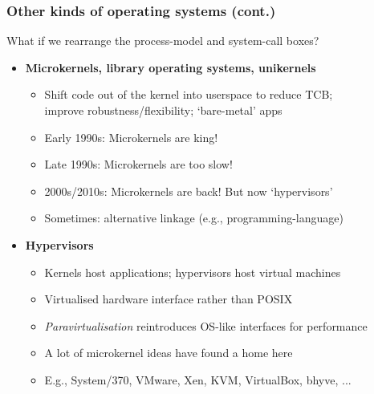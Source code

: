 \begin{frame}
  \frametitle{Other kinds of operating systems (cont.)}

  \bigskip
  What if we rearrange the process-model and system-call boxes?

  \pause
  \bigskip

  \begin{itemize}
    \item \textbf{Microkernels, library operating systems, unikernels}
    \begin{itemize}
      \item Shift code out of the kernel into userspace to reduce TCB; \\
	improve robustness/flexibility; `bare-metal' apps
      \item Early 1990s: Microkernels are king!
      \item Late 1990s: Microkernels are too slow!
      \item 2000s/2010s: Microkernels are back! But now `hypervisors'
      \item Sometimes: alternative linkage (e.g., programming-language)
    \end{itemize}

    \pause
    \bigskip

    \item \textbf{Hypervisors}
    \begin{itemize}
      \item Kernels host applications; hypervisors host virtual machines
      \item Virtualised hardware interface rather than POSIX
      \item \textit{Paravirtualisation} reintroduces OS-like interfaces for
	performance
      \item A lot of microkernel ideas have found a home here
      \item E.g., System/370, VMware, Xen, KVM, VirtualBox, bhyve, ...
    \end{itemize}
  \end{itemize}
\end{frame}

